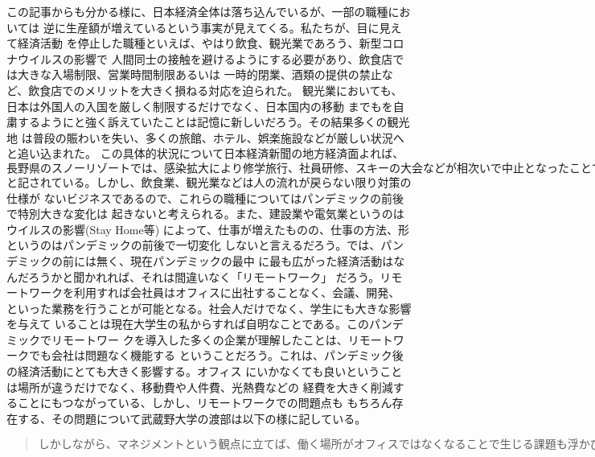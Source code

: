 \documentclass[dvipdfmx,autodetect-engine,titlepage]{jsarticle}
\begin{document}
この記事からも分かる様に、日本経済全体は落ち込んでいるが、一部の職種においては
逆に生産額が増えているという事実が見えてくる。私たちが、目に見えて経済活動
を停止した職種といえば、やはり飲食、観光業であろう、新型コロナウイルスの影響で
人間同士の接触を避けるようにする必要があり、飲食店では大きな入場制限、営業時間制限あるいは
一時的閉業、酒類の提供の禁止など、飲食店でのメリットを大きく損ねる対応を迫られた。
観光業においても、日本は外国人の入国を厳しく制限するだけでなく、日本国内の移動
までもを自粛するようにと強く訴えていたことは記憶に新しいだろう。その結果多くの観光地
は普段の賑わいを失い、多くの旅館、ホテル、娯楽施設などが厳しい状況へと追い込まれた。
この具体的状況について日本経済新聞の地方経済面よれば、
\begin{math}
  長野県のスノーリゾートでは、
感染拡大により修学旅行、社員研修、スキーの大会などが相次いで中止となったことで、少なく
とも3万6000人泊のキャンセルが発生し、損失額は3億円以上となり、観光客の入り込み
数は昨年と比べ7割以上減少した、^{(2)}
\end{math}
と記されている。しかし、飲食業、観光業などは人の流れが戻らない限り対策の仕様が
ないビジネスであるので、これらの職種についてはパンデミックの前後で特別大きな変化は
起きないと考えられる。また、建設業や電気業というのはウイルスの影響(Stay Home等)
によって、仕事が増えたものの、仕事の方法、形というのはパンデミックの前後で一切変化
しないと言えるだろう。では、パンデミックの前には無く、現在パンデミックの最中
に最も広がった経済活動はなんだろうかと聞かれれば、それは間違いなく「リモートワーク」
だろう。リモートワークを利用すれば会社員はオフィスに出社することなく、会議、開発、
といった業務を行うことが可能となる。社会人だけでなく、学生にも大きな影響を与えて
いることは現在大学生の私からすれば自明なことである。このパンデミックでリモートワー
クを導入した多くの企業が理解したことは、リモートワークでも会社は問題なく機能する
ということだろう。これは、パンデミック後の経済活動にとても大きく影響する。オフィス
にいかなくても良いということは場所が違うだけでなく、移動費や人件費、光熱費などの
経費を大きく削減することにもつながっている、しかし、リモートワークでの問題点も
もちろん存在する、その問題について武蔵野大学の渡部は以下の様に記している。

\begin{quote}
  \begin{math}
    しかしながら、マネジメントという観点に立てば、働く場所がオフィスではなく
    なることで生じる課題も浮かび上がってくる。同じ空間にいることによって部下
    の働きを目にすることができ、適時指示やアドバイスを与えていたマネジャーに
    とっては、文字通り異なる環境に置かれたことで、部下の様子を見ることができ
    ず、これまでと同じような言動では適切なマネジメントができなくなっている可能
    性がある。^{(3)}
  \end{math}
\end{quote}
\end{document}

